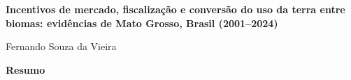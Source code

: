 \documentclass[a4paper,12pt,twoside,openany,brazil]{abntex2}
\begin{document}
\pagestyle{plain}

\begin{center}
    {\Large \bfseries Incentivos de mercado, fiscalização e conversão do uso da terra entre biomas: evidências de Mato Grosso, Brasil (2001–2024)}\par\vspace{0.8cm}
    Fernando Souza da Vieira
\end{center}

\vspace{0.8cm}

\noindent\textbf{Resumo}













\end{document}

